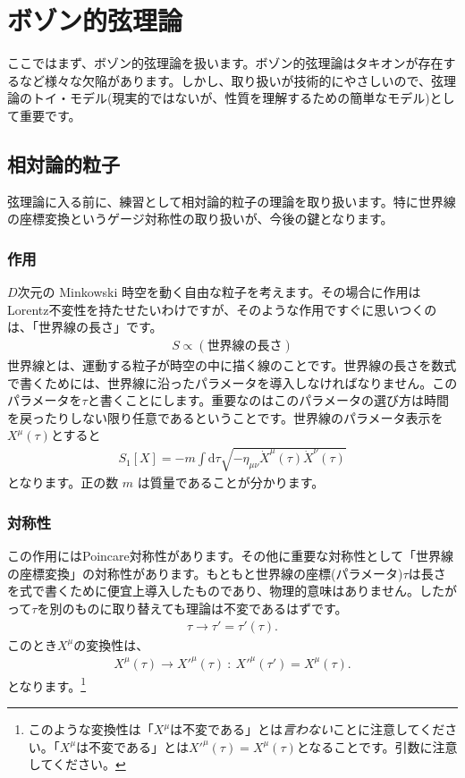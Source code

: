 \documentclass[report,paper=a4, fontsize=12pt, line_length=16cm, number_of_lines=34,dvipdfmx]{jlreq}
\numberwithin{equation}{chapter}
\numberwithin{equation}{section}
\newcommand{\di}{\mathrm{d}}
\begin{document}
\chapter{ボゾン的弦理論}

ここではまず、ボゾン的弦理論を扱います。ボゾン的弦理論はタキオンが存在するなど様々な欠陥があります。しかし、取り扱いが技術的にやさしいので、弦理論のトイ・モデル(現実的ではないが、性質を理解するための簡単なモデル)として重要です。

\section{相対論的粒子}
弦理論に入る前に、練習として相対論的粒子の理論を取り扱います。特に世界線の座標変換というゲージ対称性の取り扱いが、今後の鍵となります。
\subsection{作用}
$D$次元の Minkowski 時空を動く自由な粒子を考えます。その場合に作用はLorentz不変性を持たせたいわけですが、そのような作用ですぐに思いつくのは、「世界線の長さ」です。
\begin{align}
 S \propto (\text{世界線の長さ})
\end{align}
世界線とは、運動する粒子が時空の中に描く線のことです。世界線の長さを数式で書くためには、世界線に沿ったパラメータを導入しなければなりません。このパラメータを$\tau$と書くことにします。重要なのはこのパラメータの選び方は時間を戻ったりしない限り任意であるということです。世界線のパラメータ表示を$X^{\mu}(\tau)$とすると
\begin{align}
 S_{1}[X]=-m\int \di \tau \sqrt{-\eta_{\mu\nu}\dot{X}^{\mu}(\tau) \dot{X}^{\nu}(\tau)}
\label{particle-action1}
\end{align}
となります。正の数 $m$ は質量であることが分かります。
\subsection{対称性}
この作用にはPoincare対称性があります。その他に重要な対称性として「世界線の座標変換」の対称性があります。もともと世界線の座標(パラメータ)$\tau$は長さを式で書くために便宜上導入したものであり、物理的意味はありません。したがって$\tau$を別のものに取り替えても理論は不変であるはずです。
\begin{align}
 \tau\to \tau'=\tau'(\tau).
\end{align}
このとき$X^{\mu}$の変換性は、
\begin{align}
 X^{\mu}(\tau)\to X'^{\mu}(\tau)\ :\ X'^{\mu}(\tau')=X^{\mu}(\tau).
\label{particle-reparam1}
\end{align}
となります。\footnote{このような変換性は「$X^{\mu}$は不変である」とは{\em 言わない}ことに注意してください。「$X^{\mu}$は不変である」とは$X'^{\mu}(\tau)=X^{\mu}(\tau)$となることです。引数に注意してください。}
\end{document}
